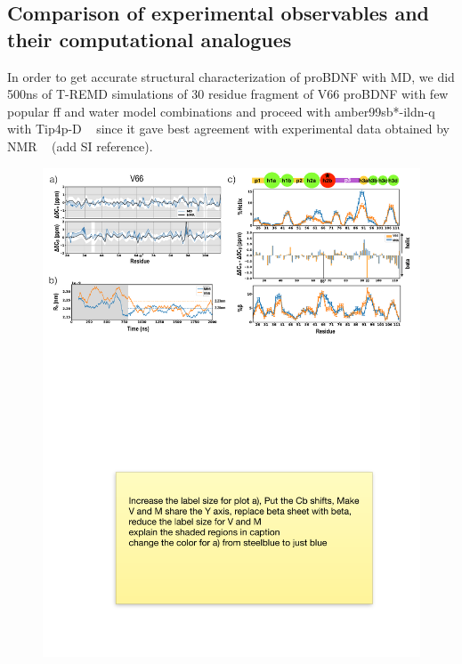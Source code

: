 \documentclass[journal=jacsat,manuscript=article]{achemso}
\begin{document}
\subsection{Comparison of experimental observables and their computational analogues}

In order to get accurate structural characterization of proBDNF with MD,  we did  500ns of T-REMD simulations of 30 residue fragment of V66 proBDNF with few popular ff  and water model combinations and proceed with  amber99sb*-ildn-q ~\cite{Lindorff-Larsen2010a, Hornak2006a} with Tip4p-D ~\cite {Piana2015} since it gave best agreement with experimental data obtained by NMR ~\cite{Anastasia2013} (add SI reference).  

\begin{figure}[!ht]
\includegraphics[scale=0.5,width=\textwidth,trim={0 0cm 0 0cm},clip]{../figures/fig2.pdf}

\end{figure}
\end{document}
